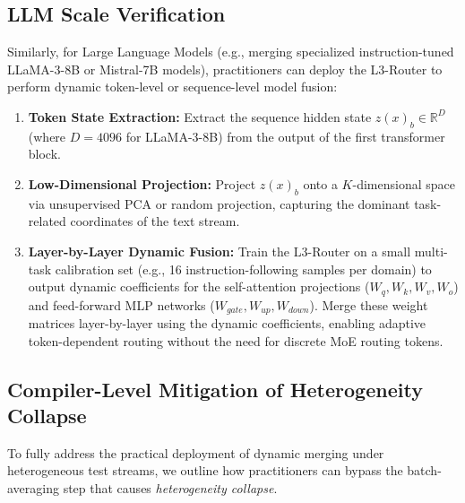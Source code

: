 \subsection{LLM Scale Verification}
Similarly, for Large Language Models (e.g., merging specialized instruction-tuned LLaMA-3-8B or Mistral-7B models), practitioners can deploy the L3-Router to perform dynamic token-level or sequence-level model fusion:
\begin{enumerate}
    \item \textbf{Token State Extraction:} Extract the sequence hidden state $z(x)_b \in \mathbb{R}^D$ (where $D=4096$ for LLaMA-3-8B) from the output of the first transformer block.
    \item \textbf{Low-Dimensional Projection:} Project $z(x)_b$ onto a $K$-dimensional space via unsupervised PCA or random projection, capturing the dominant task-related coordinates of the text stream.
    \item \textbf{Layer-by-Layer Dynamic Fusion:} Train the L3-Router on a small multi-task calibration set (e.g., 16 instruction-following samples per domain) to output dynamic coefficients for the self-attention projections ($W_q, W_k, W_v, W_o$) and feed-forward MLP networks ($W_{gate}, W_{up}, W_{down}$). Merge these weight matrices layer-by-layer using the dynamic coefficients, enabling adaptive token-dependent routing without the need for discrete MoE routing tokens.
\end{enumerate}

\subsection{Compiler-Level Mitigation of Heterogeneity Collapse}
To fully address the practical deployment of dynamic merging under heterogeneous test streams, we outline how practitioners can bypass the batch-averaging step that causes \textit{heterogeneity collapse}. 

